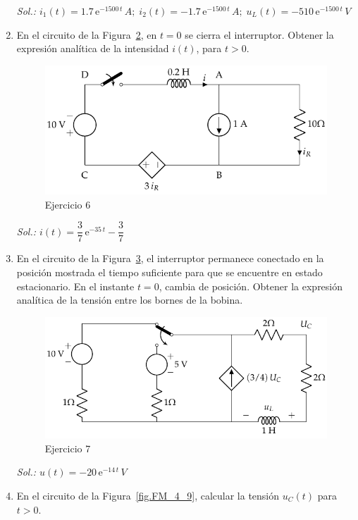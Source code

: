 \begin{enumerate}
\begin{figure}[H]
    \label{fig.ej5_BT4}
  \end{figure}
  \emph{Sol.:
    $i_1(t)=1.7\,\mathrm{e}^{-1500\,t}\,A;\;i_2(t)=-1.7\,\mathrm{e}^{-1500\,t}\,A;\;
    u_L(t)=-510\,\mathrm{e}^{-1500\,t}\,V$}
\item En el circuito de la Figura~\ref{fig.ej6_BT4}, en $t = 0$ se
  cierra el interruptor. Obtener la expresión analítica de la
  intensidad $i(t)$, para $t > 0$.
  \begin{figure}[H]
    \label{fig.ej6_BT4}
    \centering \includegraphics{../figs/ej6_BT4.pdf}
    \caption{Ejercicio 6}
  \end{figure}
  \emph{Sol.: $i(t)=\dfrac{3}{7}\,\mathrm{e}^{-35\,t}-\dfrac{3}{7}$}
\item En el circuito de la Figura~\ref{fig.ej7_BT4}, el interruptor
  permanece conectado en la posición mostrada el tiempo suficiente
  para que se encuentre en estado estacionario. En el instante $t=0$,
  cambia de posición. Obtener la expresión analítica de la tensión
  entre los bornes de la bobina.
  \begin{figure}[H]
    \centering \includegraphics{../figs/ej7_BT4.pdf}
    \caption{Ejercicio 7}
    \label{fig.ej7_BT4}
  \end{figure}
  \emph{Sol.: $u(t)=-20\,\mathrm{e}^{-14\,t}\,V$}
\item En el circuito de la Figura~\ref{fig.FM_4_9}, calcular la tensión $u_C(t)$ para $t > 0$.\\

\end{enumerate}
